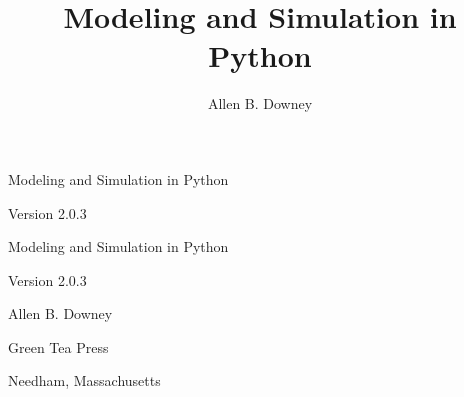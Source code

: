 \documentclass[12pt]{book}
\title{Modeling and Simulation in Python}
\author{Allen B. Downey}
\newcommand{\thetitle}{Modeling and Simulation in Python}
\newcommand{\theauthors}{Allen B. Downey}
\newcommand{\theversion}{2.0.3}
\theoremstyle{exercise}
\newcommand\blankpage{%
    \null
    \thispagestyle{empty}%
    \addtocounter{page}{-1}%
    \newpage}
\newif\ifplastex
\begin{document}
\frontmatter

\ifplastex

\maketitle

\else

\begin{latexonly}

\thispagestyle{empty}

\begin{flushright}
\vspace*{2.0in}

\begin{spacing}{3}
{\huge \thetitle}
\end{spacing}

\vspace{0.25in}

Version \theversion

\vfill

\end{flushright}


\afterpage{\blankpage}


\pagebreak
\thispagestyle{empty}

\begin{flushright}
\vspace*{2.0in}

\begin{spacing}{3}
{\huge \thetitle}
\end{spacing}

\vspace{0.25in}

Version \theversion

\vspace{1in}


{\Large
\theauthors \\
}


\vspace{0.5in}

{\Large Green Tea Press}

{\small Needham, Massachusetts}


\end{flushright}
\end{latexonly}
\end{document}
